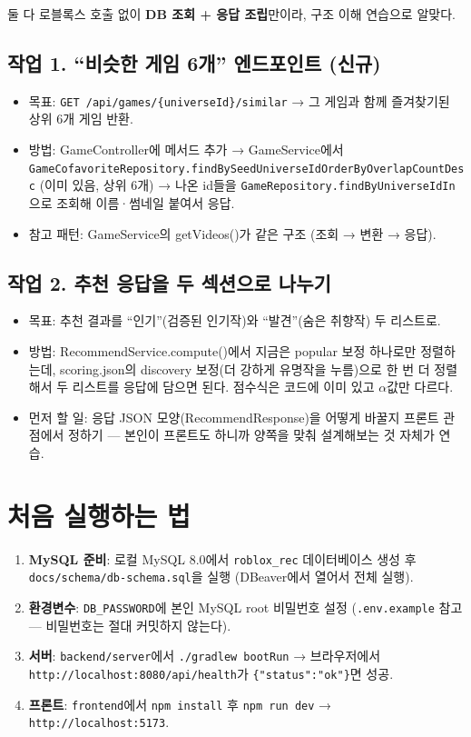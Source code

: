 \documentclass[11pt]{article}
\begin{document}
둘 다 로블록스 호출 없이 \textbf{DB 조회 + 응답 조립}만이라, 구조 이해 연습으로 알맞다.

\subsection*{작업 1. ``비슷한 게임 6개'' 엔드포인트 (신규)}
\begin{itemize}
  \item 목표: \texttt{GET /api/games/\{universeId\}/similar} → 그 게임과 함께
        즐겨찾기된 상위 6개 게임 반환.
  \item 방법: GameController에 메서드 추가 → GameService에서
        \texttt{GameCofavoriteRepository.findBySeedUniverseIdOrderByOverlapCountDesc}
        (이미 있음, 상위 6개) → 나온 id들을 \texttt{GameRepository.findByUniverseIdIn}으로
        조회해 이름·썸네일 붙여서 응답.
  \item 참고 패턴: GameService의 getVideos()가 같은 구조 (조회 → 변환 → 응답).
\end{itemize}

\subsection*{작업 2. 추천 응답을 두 섹션으로 나누기}
\begin{itemize}
  \item 목표: 추천 결과를 ``인기''(검증된 인기작)와 ``발견''(숨은 취향작) 두 리스트로.
  \item 방법: RecommendService.compute()에서 지금은 popular 보정 하나로만 정렬하는데,
        scoring.json의 discovery 보정(더 강하게 유명작을 누름)으로 한 번 더 정렬해서
        두 리스트를 응답에 담으면 된다. 점수식은 코드에 이미 있고 $\alpha$값만 다르다.
  \item 먼저 할 일: 응답 JSON 모양(RecommendResponse)을 어떻게 바꿀지 프론트 관점에서
        정하기 --- 본인이 프론트도 하니까 양쪽을 맞춰 설계해보는 것 자체가 연습.
\end{itemize}

\section{처음 실행하는 법}

\begin{enumerate}
  \item \textbf{MySQL 준비}: 로컬 MySQL 8.0에서 \texttt{roblox\_rec} 데이터베이스 생성 후
        \texttt{docs/schema/db-schema.sql}을 실행 (DBeaver에서 열어서 전체 실행).
  \item \textbf{환경변수}: \texttt{DB\_PASSWORD}에 본인 MySQL root 비밀번호 설정
        (\texttt{.env.example} 참고 --- 비밀번호는 절대 커밋하지 않는다).
  \item \textbf{서버}: \texttt{backend/server}에서 \texttt{./gradlew bootRun} →
        브라우저에서 \texttt{http://localhost:8080/api/health}가
        \texttt{\{"status":"ok"\}}면 성공.
  \item \textbf{프론트}: \texttt{frontend}에서 \texttt{npm install} 후 \texttt{npm run dev}
        → \texttt{http://localhost:5173}.
\end{enumerate}
\end{document}
